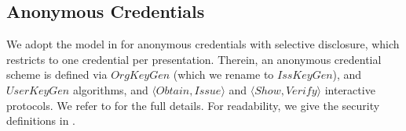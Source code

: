 



\subsection{Anonymous Credentials}
\label{ssec:related-models-ac}

We adopt the model in \cite{fhs19} for anonymous credentials with selective
disclosure, which restricts to one credential per presentation. Therein, an
anonymous credential scheme is defined via $OrgKeyGen$ (which we rename to
$IssKeyGen$), and $UserKeyGen$ algorithms, and $\langle Obtain,Issue\rangle$
and $\langle Show,Verify \rangle$ interactive protocols. We
refer to \cite{fhs19} for the full details. For readability, we give
the security definitions in .%

